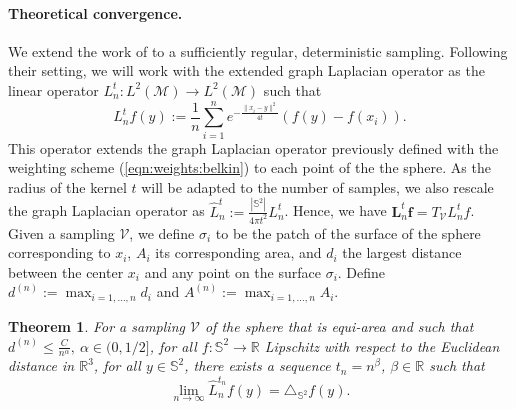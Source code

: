 \documentclass{article} %
\newtheorem{theorem}{Theorem}[section]
\renewcommand{\b}[1]{{\bm{#1}}}  %
\newcommand{\R}{\mathbb{R}}
\renewcommand{\S}{\mathbb{S}}
\newcommand{\V}{\mathcal{V}}  %
\newcommand{\nati}[1]{{\color[rgb]{.3,.5,.9}{#1}}}
\newcommand{\mdeff}[1]{{\color[rgb]{.8,.3,.2}{#1}}}
\newcommand{\eqnref}[1]{(\ref{eqn:#1})}
\newcommand{\linefrac}[2]{
    {#1/#2}
}
\begin{document}
\paragraph{Theoretical convergence.}
We extend the work of \citep{belkin2005towards} to a sufficiently regular, deterministic sampling.
Following their setting, we will work with the extended graph Laplacian operator as the linear operator $L_n^t: L^{2}(\mathcal{M}) \rightarrow L^{2}(\mathcal{M})$ such that
\begin{equation} \label{eq:Heat Kernel Graph Laplacian operator}
	 L_n^t f(y) := \frac{1}{n}\sum_{i=1}^{n} e^{ -\frac{\|x_i-y\|^2}{4t}} \left(f(y)-f(x_i)\right).
\end{equation}
This operator extends the graph Laplacian operator previously defined with the weighting scheme \eqnref{weights:belkin} to each point of the the sphere.
As the radius of the kernel $t$ will be adapted to the number of samples, we also rescale the graph Laplacian operator as $\hat{L}_n^t := \frac{|\mathbb S^2|}{4\pi t^2}L_n^t$.
Hence, we have $\b{L}_n^t \b{f} = T_\V L_n^t f$.
Given a sampling $\V$, we define $\sigma_i$ to be the patch of the surface of the sphere corresponding to $x_i$, $A_i$ its corresponding area, and $d_i$ the largest distance between the center $x_i$ and any point on the surface $\sigma_i$.
Define $d^{(n)} := \max_{i=1, \dots, n} d_i$ and $A^{(n)} := \max_{i=1, \dots, n} A_i$.
\begin{theorem}
	For a sampling $\V$ of the sphere that is equi-area and such that $d^{(n)} \leq \frac{C}{n^\alpha}, \ \alpha\in (0,\linefrac{1}{2}]$, for all $f: \S^2 \rightarrow \R$ Lipschitz with respect to the Euclidean distance in $\R^3$, for all $y\in\S^2$, there exists a sequence $t_n = n^\beta$, $\beta\in\mathbb R$ such that
	\begin{equation*}
		\lim_{n\to\infty}\hat{L}_n^{t_n}f(y) = \triangle_{\S^2}f(y).
	\end{equation*}
	\label{theo:pointwise convergence for a regular sampling}
\end{theorem}
\end{document}
